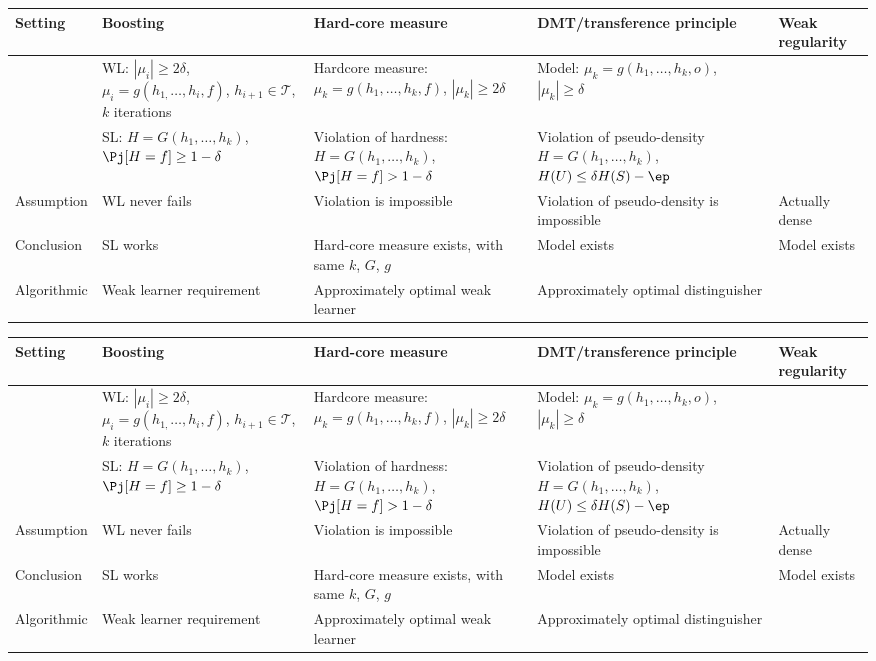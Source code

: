 \noindent
\begin{tabular}{|p{20mm}|p{35mm}|p{35mm}|p{35mm}|p{15mm}|}
\hline 
Setting & Boosting & Hard-core measure & DMT/transference principle & Weak regularity\tabularnewline

\hline 
 & WL: $|\mu_{i}|\ge2\delta$, $\mu_{i}=g(h_{1,}\ldots,h_{i},f)$, $h_{i+1}\in\mathcal{T}$, $k$
iterations & Hardcore measure: $\mu_{k}=g(h_{1},\ldots,h_{k},f)$, $|\mu_{k}|\ge2\delta$ & Model: $\mu_{k}=g(h_{1},\ldots,h_{k},o)$, $|\mu_{k}|\ge\delta$& \tabularnewline 
\hline 
 & SL: $H=G(h_{1},\ldots,h_{k})$, $\Pj[H=f]\ge1-\delta$ & Violation of hardness: $H=G(h_{1},\ldots,h_{k})$, $\Pj[H=f]>1-\delta$ & Violation of pseudo-density $H=G(h_{1},\ldots,h_{k})$, $H(U)\le\delta H(S)-\ep$& 
 \tabularnewline
\hline 
Assumption & WL never fails & Violation is impossible & Violation of pseudo-density is impossible
& Actually dense \tabularnewline
\hline 
Conclusion & SL works & Hard-core measure exists, with same $k$, $G$, $g$ & Model exists & Model exists
\tabularnewline
\hline 
Algorithmic & Weak learner requirement & Approximately optimal weak learner & Approximately optimal distinguisher & \tabularnewline
\hline 
\end{tabular}

\noindent
\begin{tabular}{|p{20mm}|p{35mm}|p{35mm}|p{35mm}|p{15mm}|}
\hline 
Setting & Boosting & Hard-core measure & DMT/transference principle & Weak regularity\tabularnewline

\hline 
 & WL: $|\mu_{i}|\ge2\delta$, $\mu_{i}=g(h_{1,}\ldots,h_{i},f)$, $h_{i+1}\in\mathcal{T}$, $k$
iterations & Hardcore measure: $\mu_{k}=g(h_{1},\ldots,h_{k},f)$, $|\mu_{k}|\ge2\delta$ & Model: $\mu_{k}=g(h_{1},\ldots,h_{k},o)$, $|\mu_{k}|\ge\delta$& \tabularnewline 
\hline 
 & SL: $H=G(h_{1},\ldots,h_{k})$, $\Pj[H=f]\ge1-\delta$ & Violation of hardness: $H=G(h_{1},\ldots,h_{k})$, $\Pj[H=f]>1-\delta$ & Violation of pseudo-density $H=G(h_{1},\ldots,h_{k})$, $H(U)\le\delta H(S)-\ep$& 
 \tabularnewline
\hline 
Assumption & WL never fails & Violation is impossible & Violation of pseudo-density is impossible
& Actually dense \tabularnewline
\hline 
Conclusion & SL works & Hard-core measure exists, with same $k$, $G$, $g$ & Model exists & Model exists
\tabularnewline
\hline 
Algorithmic & Weak learner requirement & Approximately optimal weak learner & Approximately optimal distinguisher & \tabularnewline
\hline 
\end{tabular}


